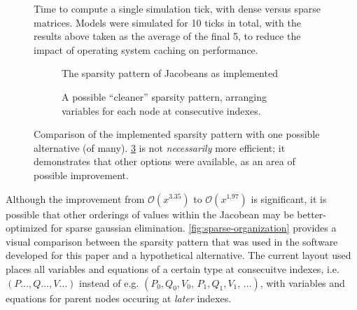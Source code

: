 
\begin{figure}[p!]
    \centering
    \begin{tikzpicture}
        
    \end{tikzpicture}
    \caption{
        Time to compute a single simulation tick, with dense versus sparse matrices. Models were
        simulated for 10 ticks in total, with the results above taken as the average of the final 5,
        to reduce the impact of operating system caching on performance.
    }
    \label{fig:sparse-speed}
\end{figure}

\begin{figure}[p!]
    \centering
    \begin{subfigure}[t]{.47\textwidth}
        \centering
        \caption{ The sparsity pattern of Jacobeans as implemented }
        \label{subfig:sparse-organization-implemented}
    \end{subfigure}%
    \hspace{1em}%
    \begin{subfigure}[t]{.47\textwidth}
        \centering
        \caption{
            A possible ``cleaner'' sparsity pattern, arranging variables for each node at
            consecutive indexes.
        }
        \label{subfig:sparse-organization-hypothetical}
    \end{subfigure}
    \caption{
        Comparison of the implemented sparsity pattern with one possible alternative (of many).
        \ref{subfig:sparse-organization-hypothetical} is not \textit{necessarily} more efficient; it
        demonstrates that other options were available, as an area of possible improvement.
    }
    \label{fig:sparse-organization}
\end{figure}

Although the improvement from $\mathcal{O}(x^{3.35})$ to $\mathcal{O}(x^{1.97})$ is significant, it
is possible that other orderings of values within the Jacobean may be better-optimized for sparse
gaussian elimination. \autoref{fig:sparse-organization} provides a visual comparison between the
sparsity pattern that was used in the software developed for this paper and a hypothetical
alternative. The current layout used places all variables and equations of a certain type at
consecuitve indexes, i.e. $(P\dots, Q\dots, V\dots)$ instead of e.g.
$(P_0,Q_0,V_0,\,P_1,Q_1,V_1,\,\dots)$, with variables and equations for parent nodes occuring at
\textit{later} indexes.

